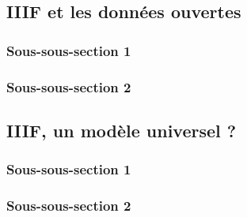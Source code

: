 
\subsection{IIIF et les données ouvertes}
    \subsubsection{Sous-sous-section 1}

    
    \subsubsection{Sous-sous-section 2}

    
    \subsection{IIIF, un modèle universel ?}
        \subsubsection{Sous-sous-section 1}


        \subsubsection{Sous-sous-section 2}


